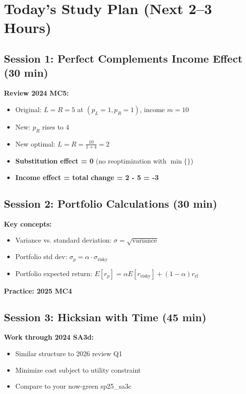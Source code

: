\documentclass[11pt]{article}
\begin{document}
\section{Today's Study Plan (Next 2--3 Hours)}

\subsection*{Session 1: Perfect Complements Income Effect (30 min)}

\textbf{Review 2024 MC5:}
\begin{itemize}
    \item Original: $L = R = 5$ at $(p_L = 1, p_R = 1)$, income $m = 10$
    \item New: $p_R$ rises to 4
    \item New optimal: $L = R = \frac{10}{1+4} = 2$
    \item \textbf{Substitution effect = 0} (no reoptimization with $\min\{\}$)
    \item \textbf{Income effect = total change = 2 - 5 = -3}
\end{itemize}

\subsection*{Session 2: Portfolio Calculations (30 min)}

\textbf{Key concepts:}
\begin{itemize}
    \item Variance vs. standard deviation: $\sigma = \sqrt{\text{variance}}$
    \item Portfolio std dev: $\sigma_p = \alpha \cdot \sigma_{\text{risky}}$
    \item Portfolio expected return: $E[r_p] = \alpha E[r_{\text{risky}}] + (1-\alpha) r_{\text{rf}}$
\end{itemize}

\textbf{Practice: 2025 MC4}

\subsection*{Session 3: Hicksian with Time (45 min)}

\textbf{Work through 2024 SA3d:}
\begin{itemize}
    \item Similar structure to 2026 review Q1
    \item Minimize cost subject to utility constraint
    \item Compare to your now-green sp25\_sa3c
\end{itemize}
\end{document}
